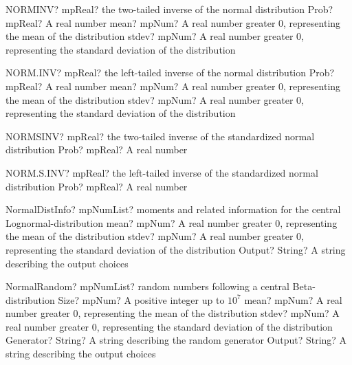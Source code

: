 \documentclass[12pt,a4paper,openany]{book}
\begin{document}
\begin{mpFunctionsExtract}
\mpWorksheetFunctionThreeNotImplemented
{NORMINV? mpReal? the two-tailed inverse of the normal distribution}
{Prob? mpReal? A real number}
{mean? mpNum? A real number greater 0, representing the mean of the distribution}
{stdev? mpNum? A real number greater 0, representing the standard deviation of the distribution}
\end{mpFunctionsExtract}

\begin{mpFunctionsExtract}
\mpWorksheetFunctionThreeNotImplemented
{NORM.INV? mpReal? the left-tailed inverse of the normal distribution}
{Prob? mpReal? A real number}
{mean? mpNum? A real number greater 0, representing the mean of the distribution}
{stdev? mpNum? A real number greater 0, representing the standard deviation of the distribution}
\end{mpFunctionsExtract}

\begin{mpFunctionsExtract}
\mpWorksheetFunctionOneNotImplemented
{NORMSINV? mpReal? the two-tailed inverse of the standardized normal distribution}
{Prob? mpReal? A real number}
\end{mpFunctionsExtract}

\begin{mpFunctionsExtract}
\mpWorksheetFunctionOneNotImplemented
{NORM.S.INV? mpReal? the left-tailed inverse of the standardized normal distribution}
{Prob? mpReal? A real number}
\end{mpFunctionsExtract}

\begin{mpFunctionsExtract}
\mpFunctionThreeNotImplemented
{NormalDistInfo? mpNumList? moments and related information for the central Lognormal-distribution}
{mean? mpNum? A real number greater 0, representing the mean of the distribution}
{stdev? mpNum? A real number greater 0, representing the standard deviation of the distribution}
{Output? String? A string describing the output choices}
\end{mpFunctionsExtract}

\begin{mpFunctionsExtract}
\mpFunctionFiveNotImplemented
{NormalRandom? mpNumList? random numbers following a central Beta-distribution}
{Size? mpNum? A positive integer up to $10^7$}
{mean? mpNum? A real number greater 0, representing the mean of the distribution}
{stdev? mpNum? A real number greater 0, representing the standard deviation of the distribution}
{Generator? String? A string describing the random generator}
{Output? String? A string describing the output choices}
\end{mpFunctionsExtract}
\end{document}
